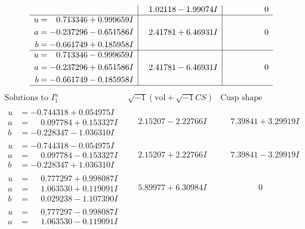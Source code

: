 \documentclass[1p]{elsarticle_modified}
\theoremstyle{definition}
\newcommand{\I}{\sqrt{-1}}
\begin{document}
$$\begin{array}{c|c|c}
 & \phantom{-}1.02118 - 1.99074 I & \phantom{-0.000000 } 0 \\ \hline\begin{aligned}
u &= \phantom{-}0.713346 + 0.999659 I \\
a &= -0.237296 - 0.651586 I \\
b &= -0.661749 + 0.185958 I\end{aligned}
 & \phantom{-}2.41781 + 6.46931 I & \phantom{-0.000000 } 0 \\ \hline\begin{aligned}
u &= \phantom{-}0.713346 - 0.999659 I \\
a &= -0.237296 + 0.651586 I \\
b &= -0.661749 - 0.185958 I\end{aligned}
 & \phantom{-}2.41781 - 6.46931 I & \phantom{-0.000000 } 0\\
 \hline 
 \end{array}$$\newpage$$\begin{array}{c|c|c}  
\text{Solutions to }I^u_{1}& \I (\text{vol} + \sqrt{-1}CS) & \text{Cusp shape}\\
 \hline 
\begin{aligned}
u &= -0.744318 + 0.054975 I \\
a &= \phantom{-}0.097784 + 0.153327 I \\
b &= -0.228347 - 1.036310 I\end{aligned}
 & \phantom{-}2.15207 - 2.22766 I & \phantom{-}7.39841 + 3.29919 I \\ \hline\begin{aligned}
u &= -0.744318 - 0.054975 I \\
a &= \phantom{-}0.097784 - 0.153327 I \\
b &= -0.228347 + 1.036310 I\end{aligned}
 & \phantom{-}2.15207 + 2.22766 I & \phantom{-}7.39841 - 3.29919 I \\ \hline\begin{aligned}
u &= \phantom{-}0.777297 + 0.998087 I \\
a &= \phantom{-}1.063530 + 0.119091 I \\
b &= \phantom{-}0.029238 - 1.107390 I\end{aligned}
 & \phantom{-}5.89977 + 6.30984 I & \phantom{-0.000000 } 0 \\ \hline\begin{aligned}
u &= \phantom{-}0.777297 - 0.998087 I \\
a &= \phantom{-}1.063530 - 0.119091 I \\

\end{aligned}
\end{array}$$
\end{document}
